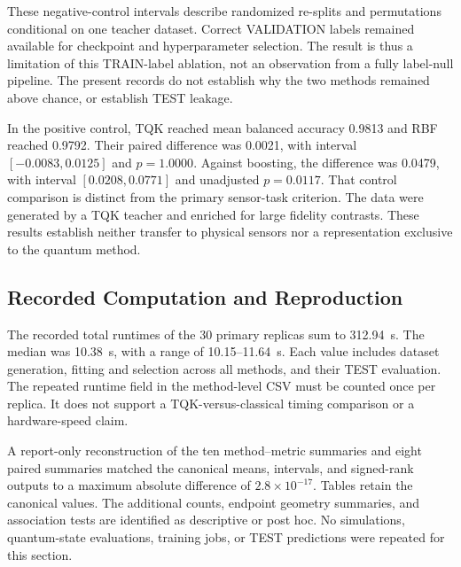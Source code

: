 

These negative-control intervals describe randomized re-splits and permutations conditional on one teacher dataset. Correct VALIDATION labels remained available for checkpoint and hyperparameter selection. The result is thus a limitation of this TRAIN-label ablation, not an observation from a fully label-null pipeline. The present records do not establish why the two methods remained above chance, or establish TEST leakage.

In the positive control, TQK reached mean balanced accuracy 0.9813 and RBF reached 0.9792. Their paired difference was 0.0021, with interval $[-0.0083,0.0125]$ and $p=1.0000$. Against boosting, the difference was 0.0479, with interval $[0.0208,0.0771]$ and unadjusted $p=0.0117$. That control comparison is distinct from the primary sensor-task criterion. The data were generated by a TQK teacher and enriched for large fidelity contrasts. These results establish neither transfer to physical sensors nor a representation exclusive to the quantum method.

\subsection{Recorded Computation and Reproduction}
\label{sec:results-computation}

The recorded total runtimes of the 30 primary replicas sum to 312.94~s. The median was 10.38~s, with a range of 10.15--11.64~s. Each value includes dataset generation, fitting and selection across all methods, and their TEST evaluation. The repeated runtime field in the method-level CSV must be counted once per replica. It does not support a TQK-versus-classical timing comparison or a hardware-speed claim.

A report-only reconstruction of the ten method--metric summaries and eight paired summaries matched the canonical means, intervals, and signed-rank outputs to a maximum absolute difference of $2.8\times10^{-17}$. Tables retain the canonical values. The additional counts, endpoint geometry summaries, and association tests are identified as descriptive or post hoc. No simulations, quantum-state evaluations, training jobs, or TEST predictions were repeated for this section.
